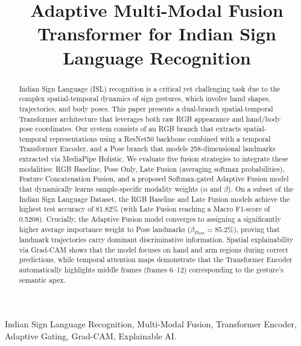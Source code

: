 \documentclass[conference]{IEEEtran}
\begin{document}
\title{Adaptive Multi-Modal Fusion Transformer for Indian Sign Language Recognition\\
}

\author{
}

\maketitle

\begin{abstract}
Indian Sign Language (ISL) recognition is a critical yet challenging task due to the complex spatial-temporal dynamics of sign gestures, which involve hand shapes, trajectories, and body poses. This paper presents a dual-branch spatial-temporal Transformer architecture that leverages both raw RGB appearance and hand/body pose coordinates. Our system consists of an RGB branch that extracts spatial-temporal representations using a ResNet50 backbone combined with a temporal Transformer Encoder, and a Pose branch that models 258-dimensional landmarks extracted via MediaPipe Holistic. We evaluate five fusion strategies to integrate these modalities: RGB Baseline, Pose Only, Late Fusion (averaging softmax probabilities), Feature Concatenation Fusion, and a proposed Softmax-gated Adaptive Fusion model that dynamically learns sample-specific modality weights ($\alpha$ and $\beta$). On a subset of the Indian Sign Language Dataset, the RGB Baseline and Late Fusion models achieve the highest test accuracy of 81.82\% (with Late Fusion reaching a Macro F1-score of 0.5208). Crucially, the Adaptive Fusion model converges to assigning a significantly higher average importance weight to Pose landmarks ($\beta_{Pose} = 85.2\%$), proving that landmark trajectories carry dominant discriminative information. Spatial explainability via Grad-CAM shows that the model focuses on hand and arm regions during correct predictions, while temporal attention maps demonstrate that the Transformer Encoder automatically highlights middle frames (frames 6--12) corresponding to the gesture's semantic apex.
\end{abstract}

\begin{IEEEkeywords}
Indian Sign Language Recognition, Multi-Modal Fusion, Transformer Encoder, Adaptive Gating, Grad-CAM, Explainable AI.
\end{IEEEkeywords}
\end{document}
